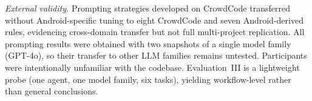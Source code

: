 \textit{External validity.}
Prompting strategies developed on CrowdCode transferred without
Android-specific tuning to eight CrowdCode and seven Android-derived
rules, evidencing cross-domain transfer but not full multi-project
replication. All prompting results were obtained with two snapshots of a single
model family (GPT-4o), so their transfer to other LLM families remains
untested. Participants were intentionally unfamiliar with the
codebase. Evaluation~III is a lightweight probe (one agent, one
model family, six tasks), yielding workflow-level rather than general
conclusions.


